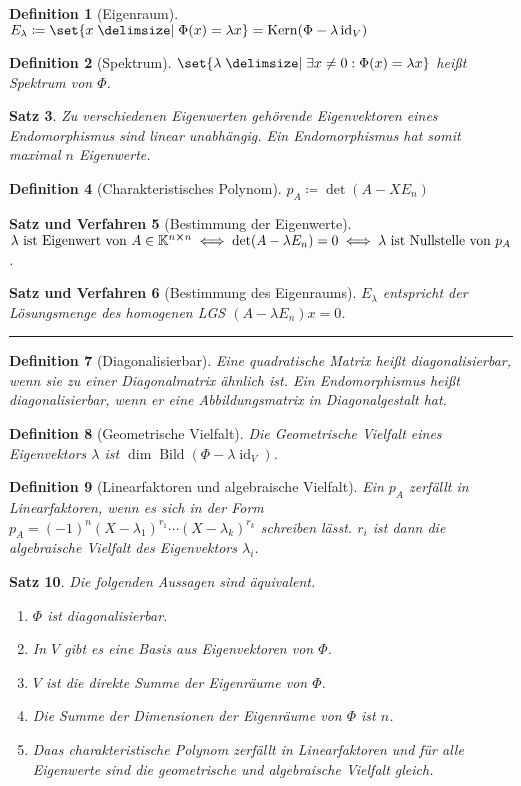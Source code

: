 \documentclass[a4paper]{article}
\newcounter{Sec}
\theoremstyle{marginbreak}
\newtheorem{definition}{Definition}[Sec]
\newtheorem{satz}[definition]{Satz}
\newtheorem{satzver}[definition]{Satz und Verfahren}
\DeclareMathOperator{\Kern}{Kern}
\DeclareMathOperator{\Bild}{Bild}
\DeclareMathOperator{\id}{id}
\newcommand{\sep}{%
	\rule{\textwidth}{0.3pt}%
	\stepcounter{Sec}%
	}
\begin{document}
	\begin{definition}[Eigenraum]
		$E_\lambda\coloneqq\set{x\given\Phi(x)=\lambda x}=\Kern(\Phi-\lambda\id_V)$
	\end{definition}
	\begin{definition}[Spektrum]
		$\set{\lambda\given\exists x\neq0:\Phi(x)=\lambda x}$ heißt Spektrum von $\Phi$.
	\end{definition}
	\begin{satz}
		Zu verschiedenen Eigenwerten gehörende Eigenvektoren eines Endomorphismus sind linear unabhängig.
		Ein Endomorphismus hat somit maximal $n$ Eigenwerte.
	\end{satz}
	\begin{definition}[Charakteristisches Polynom]
		$p_A\coloneqq\det(A-XE_n)$
	\end{definition}
	\begin{satzver}[Bestimmung der Eigenwerte]
		$\lambda~\text{ist Eigenwert von $A \in\mathbb{K}^{n\cross n}$} \iff \det(A-\lambda E_n) = 0 \iff \lambda~\text{ist Nullstelle von $p_A$}$.
	\end{satzver}
	\begin{satzver}[Bestimmung des Eigenraums]
		$E_\lambda$ entspricht der Lösungsmenge des homogenen LGS $(A-\lambda E_n)x = 0$.
	\end{satzver}
	\sep
	\begin{definition}[Diagonalisierbar]
		Eine quadratische Matrix heißt diagonalisierbar, wenn sie zu einer Diagonalmatrix
		ähnlich ist. Ein Endomorphismus heißt diagonalisierbar, wenn er eine Abbildungsmatrix
		in Diagonalgestalt hat.
	\end{definition}
	\begin{definition}[Geometrische Vielfalt]
		Die Geometrische Vielfalt eines Eigenvektors $\lambda$ ist $\dim\Bild(\Phi-\lambda\id_V)$.
	\end{definition}
	\begin{definition}[Linearfaktoren und algebraische Vielfalt]
		Ein $p_A$ zerfällt in Linearfaktoren, wenn es sich
		in der Form $p_A=(-1)^n(X-\lambda_1)^{r_1}\cdots(X-\lambda_k)^{r_k}$ schreiben
		lässt. $r_i$ ist dann die algebraische Vielfalt des Eigenvektors $\lambda_i$.
	\end{definition}
	\begin{satz}
		Die folgenden Aussagen sind äquivalent.
		\begin{enumerate}[label=(\alph*)]
			\item $\Phi$ ist diagonalisierbar.
			\item In $V$ gibt es eine Basis aus Eigenvektoren von $\Phi$.
			\item $V$ ist die direkte Summe der Eigenräume von $\Phi$.
			\item Die Summe der Dimensionen der Eigenräume von $\Phi$ ist $n$.
			\item Daas charakteristische Polynom zerfällt in Linearfaktoren und
			für alle Eigenwerte sind die geometrische und algebraische Vielfalt gleich.
		\end{enumerate}
	\end{satz}
\end{document}
